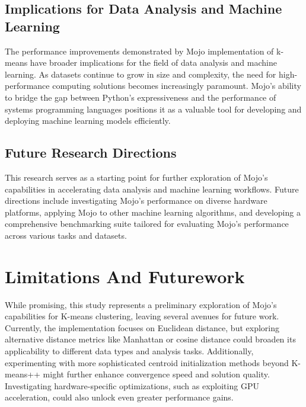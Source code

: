 \documentclass[conference]{IEEEtran}
\begin{document}
\subsection{Implications for Data Analysis and Machine Learning}
The performance improvements demonstrated by Mojo implementation of k-means have broader implications for the field of data analysis and machine learning. As datasets continue to grow in size and complexity, the need for high-performance computing solutions becomes increasingly paramount. Mojo's ability to bridge the gap between Python's expressiveness and the performance of systems programming languages positions it as a valuable tool for developing and deploying machine learning models efficiently.


\subsection{Future Research Directions}
This research serves as a starting point for further exploration of Mojo's capabilities in accelerating data analysis and machine learning workflows. Future directions include investigating Mojo's performance on diverse hardware platforms, applying Mojo to other machine learning algorithms, and developing a comprehensive benchmarking suite tailored for evaluating Mojo's performance across various tasks and datasets.

\section{Limitations And Futurework}
While promising, this study represents a preliminary exploration of Mojo's capabilities for K-means clustering, leaving several avenues for future work. Currently, the implementation focuses on Euclidean distance, but exploring alternative distance metrics like Manhattan or cosine distance could broaden its applicability to different data types and analysis tasks. Additionally, experimenting with more sophisticated centroid initialization methods beyond K-means++ might further enhance convergence speed and solution quality. Investigating hardware-specific optimizations, such as exploiting GPU acceleration, could also unlock even greater performance gains.
\end{document}

